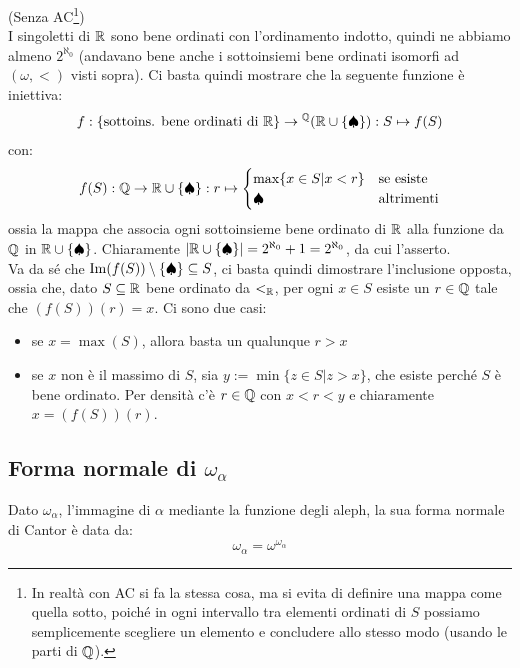 \begin{soln}
	(Senza AC\footnote{In realt\`a con AC si fa la stessa cosa, ma si evita di definire una mappa come quella sotto, poich\'e in ogni intervallo tra elementi ordinati di $S$ possiamo semplicemente scegliere un elemento e concludere allo stesso modo (usando le parti di $\mathbb Q$).})\\
	I singoletti di $\mathbb R$ sono bene ordinati con l'ordinamento indotto, quindi ne abbiamo almeno $2^{\aleph_0}$ (andavano bene anche i sottoinsiemi bene ordinati isomorfi ad $(\omega,<)$ visti sopra).
	Ci basta quindi mostrare che la seguente funzione \`e iniettiva:
	\[ f : \{\text{sottoins. bene ordinati di $\mathbb R$}\} \to {}^\mathbb Q(\mathbb R \cup \{\spadesuit\}) : S \mapsto f(S)
		\]
	con:
	\[ f(S) : \mathbb Q \to \mathbb R \cup \{\spadesuit\} : r \mapsto \begin{cases}
		\max\{x \in S | x < r\} &\text{se esiste} \\
		\spadesuit &\text{altrimenti}
	\end{cases}
		\]
	ossia la mappa che associa ogni sottoinsieme bene ordinato di $\mathbb R$ alla funzione da $\mathbb Q$ in $\mathbb R \cup \{\spadesuit\}$. Chiaramente $|\mathbb R \cup \{\spadesuit\}| = 2^{\aleph_0} + 1 = 2^{\aleph_0}$, da cui l'asserto.\\
	Va da s\'e che $\operatorname{Im}(f(S))\setminus\{\spadesuit\} \subseteq S$, ci basta quindi dimostrare l'inclusione opposta, ossia che, dato $S \subseteq \mathbb R$ bene ordinato da $<_{\mathbb R}$, per ogni $x \in S$ esiste un $r \in \mathbb Q$ tale che $(f(S))(r) = x$. Ci sono due casi:
	\begin{itemize}
		\item[-] se $x = \max(S)$, allora basta un qualunque $r > x$
		\item[-] se $x$ non \`e il massimo di $S$, sia $y := \min\{z \in S | z > x\}$, che esiste perch\'e $S$ \`e bene ordinato. Per densit\`a c'\`e $r \in \mathbb Q$ con $x<r<y$ e chiaramente $x = (f(S))(r)$.
	\end{itemize}
\end{soln}

\pagebreak
\subsection{\texorpdfstring{Forma normale di $\omega_\alpha$}{Forma normale di omega-alpha}}
\begin{proposition}[$\omega_\alpha = \omega^{\omega_\alpha}$]
	Dato $\omega_\alpha$, l'immagine di $\alpha$ mediante la funzione degli aleph, la sua forma normale di Cantor \`e data da:
	\[ \omega_\alpha = \omega^{\omega_\alpha}
		\]
\end{proposition}


